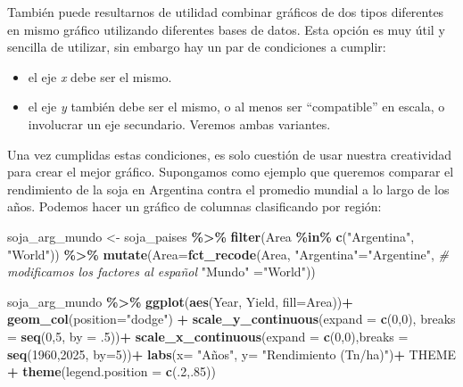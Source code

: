 \documentclass[
]{article}
\newenvironment{Shaded}{\begin{snugshade}}{\end{snugshade}}
\newcommand{\AttributeTok}[1]{\textcolor[rgb]{0.13,0.29,0.53}{#1}}
\newcommand{\CommentTok}[1]{\textcolor[rgb]{0.56,0.35,0.01}{\textit{#1}}}
\newcommand{\DecValTok}[1]{\textcolor[rgb]{0.00,0.00,0.81}{#1}}
\newcommand{\FunctionTok}[1]{\textcolor[rgb]{0.13,0.29,0.53}{\textbf{#1}}}
\newcommand{\NormalTok}[1]{#1}
\newcommand{\OtherTok}[1]{\textcolor[rgb]{0.56,0.35,0.01}{#1}}
\newcommand{\SpecialCharTok}[1]{\textcolor[rgb]{0.81,0.36,0.00}{\textbf{#1}}}
\newcommand{\StringTok}[1]{\textcolor[rgb]{0.31,0.60,0.02}{#1}}
\providecommand{\tightlist}{%
  \setlength{\itemsep}{0pt}\setlength{\parskip}{0pt}}
\begin{document}
También puede resultarnos de utilidad combinar gráficos de dos tipos
diferentes en mismo gráfico utilizando diferentes bases de datos. Esta
opción es muy útil y sencilla de utilizar, sin embargo hay un par de
condiciones a cumplir:

\begin{itemize}
\tightlist
\item
  el eje \emph{x} debe ser el mismo.
\item
  el eje \emph{y} también debe ser el mismo, o al menos ser
  ``compatible'' en escala, o involucrar un eje secundario. Veremos
  ambas variantes.
\end{itemize}

Una vez cumplidas estas condiciones, es solo cuestión de usar nuestra
creatividad para crear el mejor gráfico. Supongamos como ejemplo que
queremos comparar el rendimiento de la soja en Argentina contra el
promedio mundial a lo largo de los años. Podemos hacer un gráfico de
columnas clasificando por región:

\begin{Shaded}
\begin{Highlighting}[]
\NormalTok{soja\_arg\_mundo }\OtherTok{\textless{}{-}}\NormalTok{ soja\_paises }\SpecialCharTok{\%\textgreater{}\%} \FunctionTok{filter}\NormalTok{(Area }\SpecialCharTok{\%in\%} \FunctionTok{c}\NormalTok{(}\StringTok{"Argentina"}\NormalTok{, }\StringTok{"World"}\NormalTok{)) }\SpecialCharTok{\%\textgreater{}\%} 
  \FunctionTok{mutate}\NormalTok{(}\AttributeTok{Area=}\FunctionTok{fct\_recode}\NormalTok{(Area,}
                              \StringTok{"Argentina"}\OtherTok{=}\StringTok{"Argentine"}\NormalTok{, }\CommentTok{\# modificamos los factores al español}
                              \StringTok{"Mundo"} \OtherTok{=}\StringTok{"World"}\NormalTok{)) }

\NormalTok{soja\_arg\_mundo }\SpecialCharTok{\%\textgreater{}\%} 
\FunctionTok{ggplot}\NormalTok{(}\FunctionTok{aes}\NormalTok{(Year, Yield, }\AttributeTok{fill=}\NormalTok{Area))}\SpecialCharTok{+}
  \FunctionTok{geom\_col}\NormalTok{(}\AttributeTok{position=}\StringTok{"dodge"}\NormalTok{) }\SpecialCharTok{+}
  \FunctionTok{scale\_y\_continuous}\NormalTok{(}\AttributeTok{expand =} \FunctionTok{c}\NormalTok{(}\DecValTok{0}\NormalTok{,}\DecValTok{0}\NormalTok{), }\AttributeTok{breaks =} \FunctionTok{seq}\NormalTok{(}\DecValTok{0}\NormalTok{,}\DecValTok{5}\NormalTok{, }\AttributeTok{by =}\NormalTok{ .}\DecValTok{5}\NormalTok{))}\SpecialCharTok{+}
  \FunctionTok{scale\_x\_continuous}\NormalTok{(}\AttributeTok{expand =} \FunctionTok{c}\NormalTok{(}\DecValTok{0}\NormalTok{,}\DecValTok{0}\NormalTok{),}\AttributeTok{breaks =} \FunctionTok{seq}\NormalTok{(}\DecValTok{1960}\NormalTok{,}\DecValTok{2025}\NormalTok{, }\AttributeTok{by=}\DecValTok{5}\NormalTok{))}\SpecialCharTok{+}
  \FunctionTok{labs}\NormalTok{(}\AttributeTok{x=} \StringTok{"Años"}\NormalTok{,}
       \AttributeTok{y=} \StringTok{"Rendimiento (Tn/ha)"}\NormalTok{)}\SpecialCharTok{+}
\NormalTok{  THEME }\SpecialCharTok{+}
  \FunctionTok{theme}\NormalTok{(}\AttributeTok{legend.position =} \FunctionTok{c}\NormalTok{(.}\DecValTok{2}\NormalTok{,.}\DecValTok{85}\NormalTok{))}
\end{Highlighting}
\end{Shaded}
\end{document}
